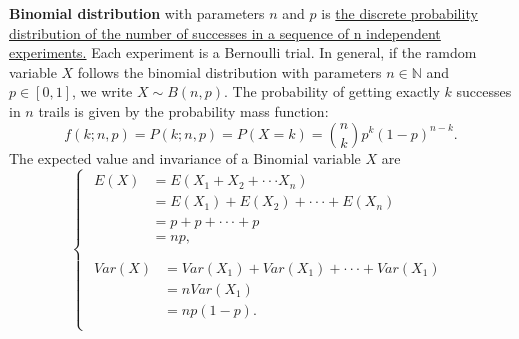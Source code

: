 \documentclass[10pt,onecolumn]{book}
\begin{document}
\textbf{Binomial distribution} with parameters $n$ and $p$ is \uline{the discrete probability distribution of the number of successes in a sequence of n independent experiments.} Each experiment is a Bernoulli trial. In general, if the ramdom variable $X$ follows the binomial distribution with parameters $n \in \mathbb{N}$ and $p \in [0, 1]$, we write $X \sim B(n, p)$. The probability of getting exactly $k$ successes in $n$ trails is given by the probability mass function:
\begin{equation}
f(k; n, p) = P(k; n, p) = P(X = k) = \binom{n}{k} p^k (1-p)^{n-k}.
\end{equation}
The expected value and invariance of a Binomial variable $X$ are
\begin{equation}\label{eq:binomial_distribution_e_var}
\left\{
	\begin{array}{lr}
	\begin{split}
	E(X)  & = E(X_{1} + X_{2} + \cdot \cdot \cdot X_{n}) \\
		  & = E(X_{1}) + E(X_{2}) + \cdot \cdot \cdot + E(X_{n}) \\
		  & = p + p + \cdot \cdot \cdot + p \\
		  & = np, \\
	\end{split} \\
	\begin{split}
	Var(X) & = Var(X_{1}) + Var(X_{1}) + \cdot \cdot \cdot + Var(X_{1}) \\
		   & = nVar(X_{1}) \\
		   & = np(1-p). \\
	\end{split} 
	\end{array}
\right.
\end{equation}
\end{document}
